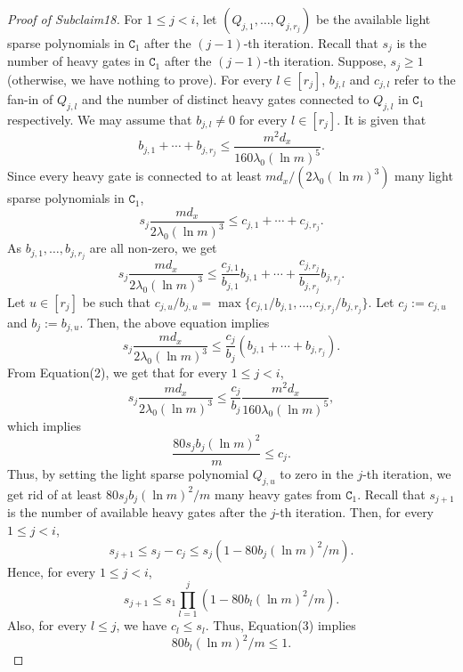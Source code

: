 \begin{proof}[Proof of Subclaim18]
For $1\le j<i$, let $(Q_{j,1},\ldots,Q_{j,r_j})$ be the available light sparse polynomials in $\mathtt C_1$ after the $(j-1)$-th iteration. Recall that $s_j$ is the number of heavy gates in $\mathtt C_1$ after the $(j-1)$-th iteration. Suppose, $s_j\ge1$ (otherwise, we have nothing to prove). For every $l\in[r_j]$, $b_{j,l}$ and $c_{j,l}$ refer to the fan-in of $Q_{j,l}$ and the number of distinct heavy gates connected to $Q_{j,l}$ in $\mathtt C_1$ respectively. We may assume that $b_{j,l}\ne0$ for every $l\in[r_j]$. It is given that
\begin{equation}
b_{j,1}+\cdots+b_{j,r_j}\le\frac{m^2d_x}{160\lambda_0(\ln m)^5}.\tag{2}
\end{equation}
Since every heavy gate is connected to at least $md_x/(2\lambda_0(\ln m)^3)$ many light sparse polynomials in $\mathtt C_1$,
\[
s_j\frac{md_x}{2\lambda_0(\ln m)^3}\le c_{j,1}+\cdots+c_{j,r_j}.
\]
As $b_{j,1},\ldots,b_{j,r_j}$ are all non-zero, we get
\[
s_j\frac{md_x}{2\lambda_0(\ln m)^3}
\le\frac{c_{j,1}}{b_{j,1}}b_{j,1}+\cdots+\frac{c_{j,r_j}}{b_{j,r_j}}b_{j,r_j}.
\]
Let $u\in[r_j]$ be such that $c_{j,u}/b_{j,u}=\max\{c_{j,1}/b_{j,1},\ldots,c_{j,r_j}/b_{j,r_j}\}$. Let $c_j:=c_{j,u}$ and $b_j:=b_{j,u}$. Then, the above equation implies
\[
s_j\frac{md_x}{2\lambda_0(\ln m)^3}\le\frac{c_j}{b_j}(b_{j,1}+\cdots+b_{j,r_j}).
\]
From Equation(2), we get that for every $1\le j<i$,
\[
s_j\frac{md_x}{2\lambda_0(\ln m)^3}
\le\frac{c_j}{b_j}\frac{m^2d_x}{160\lambda_0(\ln m)^5},
\]
which implies
\begin{equation}
\frac{80s_jb_j(\ln m)^2}{m}\le c_j.\tag{3}
\end{equation}
Thus, by setting the light sparse polynomial $Q_{j,u}$ to zero in the $j$-th iteration, we get rid of at least $80s_jb_j(\ln m)^2/m$ many heavy gates from $\mathtt C_1$. Recall that $s_{j+1}$ is the number of available heavy gates after the $j$-th iteration. Then, for every $1\le j<i$,
\begin{equation}
s_{j+1}\le s_j-c_j\le s_j(1-80b_j(\ln m)^2/m).\tag{4}
\end{equation}
Hence, for every $1\le j<i$,
\begin{equation}
s_{j+1}\le s_1\prod_{l=1}^j(1-80b_l(\ln m)^2/m).\tag{5}
\end{equation}
Also, for every $l\le j$, we have $c_l\le s_l$. Thus, Equation(3) implies
\begin{equation}
80b_l(\ln m)^2/m\le1.\tag{6}
\end{equation}

\end{proof}
